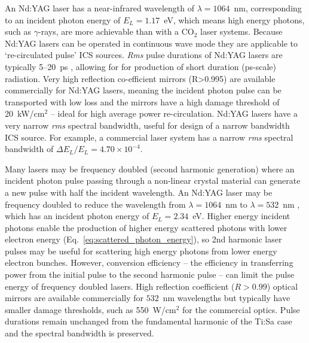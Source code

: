 \documentclass[../main.tex]{subfiles}
\begin{document}
An Nd:YAG laser has a near-infrared wavelength of $\lambda=1064$~\si{\nano\meter}, corresponding to an incident photon energy of $E_{L}=1.17$~\si{\electronvolt}, which means high energy photons, such as $\gamma$-rays, are more achievable than with a CO$_{2}$ laser systems. Because Nd:YAG lasers can be operated in continuous wave mode they are applicable to `re-circulated pulse' ICS sources. \textit{Rms} pulse durations of Nd:YAG lasers are typically 5--20~\si{\pico\second} \cite{pogorelsky2020converting,akagi2016narrow}, allowing for for production of short duration (\si{\pico\second}-scale) radiation. Very high reflection co-efficient mirrors (R>0.995) are available commercially for Nd:YAG lasers, meaning the incident photon pulse can be transported with low loss and the mirrors have a high damage threshold of 20~\si{\kilo\watt}/\si{\centi\meter}$^{2}$ \cite{thorlabs2021ndyagoptics} -- ideal for high average power re-circulation. Nd:YAG lasers have a very narrow \textit{rms} spectral bandwidth, useful for design of a narrow bandwidth ICS source. For example, a commercial laser system \cite{thorlabs2021ndyag200} has a narrow \textit{rms} spectral bandwidth of $\Delta E_{L}/E_{L} = 4.70\times 10^{-4}$. 



Many lasers may be frequency doubled (second harmonic generation) \cite{franken1961generation} where an incident photon pulse passing through a non-linear crystal material can generate a new pulse with half the incident wavelength. An Nd:YAG laser may be frequency doubled to reduce the wavelength from $\lambda=1064$~\si{\nano\meter} to $\lambda=532$~\si{\nano\meter} \cite{kozlovsky1988efficient}, which has an incident photon energy of $E_{L}=2.34$~\si{\electronvolt}. Higher energy incident photons enable the production of higher energy scattered photons with lower electron energy (Eq.~\ref{eq:scattered_photon_energy}), so 2nd harmonic laser pulses may be useful for scattering high energy photons from lower energy electron bunches. However, conversion efficiency -- the efficiency in transferring power from the initial pulse to the second harmonic pulse -- can limit the pulse energy of frequency doubled lasers. High reflection coefficient ($R>0.99$) optical mirrors are available commercially \cite{thorlabs2021ndyagoptics} for $532$~\si{\nano\meter} wavelengths but typically have smaller damage thresholds, such as 550~\si{\watt}/\si{\centi\meter}$^{2}$ for the commercial optics. Pulse durations remain unchanged from the fundamental harmonic of the Ti:Sa case and the spectral bandwidth is preserved.  
\end{document}
